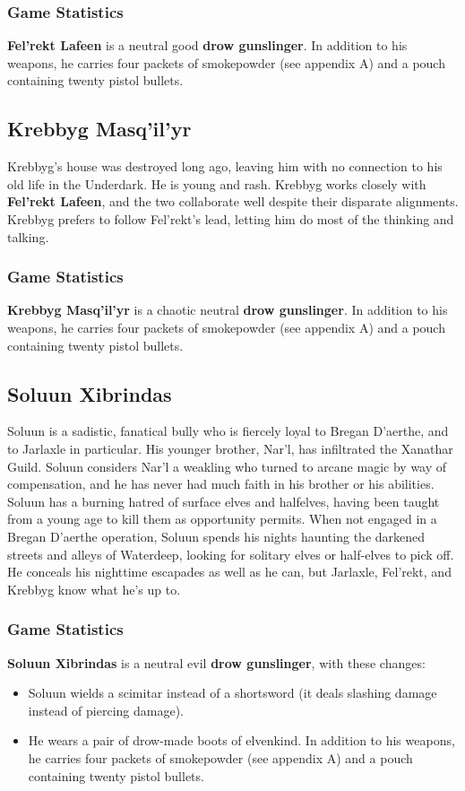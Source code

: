 \documentclass[10pt,a4paper,twoside,twocolumn,openany,nodeprecatedcode]{dndbook}
\begin{document}
\subsubsection{Game Statistics}
\textbf{Fel'rekt Lafeen} is a neutral good \textbf{drow gunslinger}. In addition to his weapons, he carries four packets of smokepowder (see appendix A) and a pouch containing twenty pistol bullets.
\subsection{Krebbyg Masq'il'yr}
Krebbyg's house was destroyed long ago, leaving him with no connection to his old life in the Underdark. He is young and rash.
Krebbyg works closely with \textbf{Fel'rekt Lafeen}, and the two collaborate well despite their disparate alignments. Krebbyg prefers to follow Fel'rekt's lead, letting him do most of the thinking and talking.
\subsubsection{Game Statistics}
\textbf{Krebbyg Masq'il'yr} is a chaotic neutral \textbf{drow gunslinger}. In addition to his weapons, he carries four packets of smokepowder (see appendix A) and a pouch containing twenty pistol bullets.
\subsection{Soluun Xibrindas}
Soluun is a sadistic, fanatical bully who is fiercely loyal to Bregan D'aerthe, and to Jarlaxle in particular. His younger brother, Nar'l, has infiltrated the Xanathar Guild. Soluun considers Nar'l a weakling who turned to arcane magic by way of compensation, and he has never had much faith in his brother or his abilities.
Soluun has a burning hatred of surface elves and halfelves, having been taught from a young age to kill them as opportunity permits. When not engaged in a Bregan D'aerthe operation, Soluun spends his nights haunting the darkened streets and alleys of Waterdeep, looking for solitary elves or half-elves to pick off. He conceals his nighttime escapades as well as he can, but Jarlaxle, Fel'rekt, and Krebbyg know what he's up to.
\subsubsection{Game Statistics}
\textbf{Soluun Xibrindas} is a neutral evil \textbf{drow gunslinger}, with these changes:
\begin{itemize}

\item Soluun wields a scimitar instead of a shortsword (it deals slashing damage instead of piercing damage).
\item He wears a pair of drow-made boots of elvenkind. In addition to his weapons, he carries four packets of smokepowder (see appendix A) and a pouch containing twenty pistol bullets.
\end{itemize}
\end{document}

